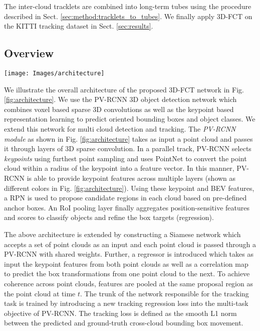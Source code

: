 \documentclass[10pt,twocolumn,letterpaper]{article}
\begin{document}
The inter-cloud tracklets are combined into long-term tubes using the procedure described in Sect. \ref{sec:method:tracklets_to_tubes}. We finally apply 3D-FCT on the KITTI tracking dataset \cite{Geiger2013IJRR} in Sect. \ref{sec:results}.

\subsection{Overview}\label{sec:method:overview}
\begin{figure*}
   \begin{center}
   \texttt{[image: Images/architecture]}
\end{center}
      \caption{Overview of the 3D-FCT temporal detection architecture. A pair of point clouds are processed by a Siamese PV-RCNN network to provide keypoint features. These keypoint features are compared using a correlation operation before being used to regress cross-cloud bounding box targets.}
   \label{fig:architecture}
\end{figure*}

We illustrate the overall architecture of the proposed 3D-FCT network in Fig. \ref{fig:architecture}. We use the PV-RCNN \cite{Shi_2020_CVPR} 3D object detection network which combines voxel based sparse 3D convolutions as well as the keypoint based representation learning to predict oriented bounding boxes and object classes. We extend this network for multi cloud detection and tracking. The {\em PV-RCNN module} as shown in Fig. \ref{fig:architecture} takes as input a point cloud and passes it through layers of 3D sparse convolution. In a parallel track, PV-RCNN selects {\em keypoints} using furthest point sampling and uses PointNet \cite{Qi2017} to convert the point cloud within a radius of the keypoint into a feature vector. In this manner, PV-RCNN is able to provide keypoint features across multiple layers (shown as different colors in Fig. \ref{fig:architecture}). Using these keypoint and BEV features, a RPN is used to propose candidate regions in each cloud based on pre-defined anchor boxes. An RoI pooling layer finally aggregates position-sensitive features and scores to classify objects and refine the box targets (regression).

The above architecture is extended by constructing a Siamese network \cite{Bromley1994} which accepts a set of point clouds as an input and each point cloud is passed through a PV-RCNN with shared weights. Further, a regressor is introduced which takes as input the keypoint features from both point clouds as well as a correlation map to predict the box transformations from one point cloud to the next. To achieve coherence across point clouds, features are pooled at the same proposal region as the point cloud at time $t$. The trunk of the network responsible for the tracking task is trained by introducing a new tracking regression loss into the multi-task objective of PV-RCNN. The tracking loss is defined as the smooth L1 norm between the predicted and ground-truth cross-cloud bounding box movement.
\end{document}
